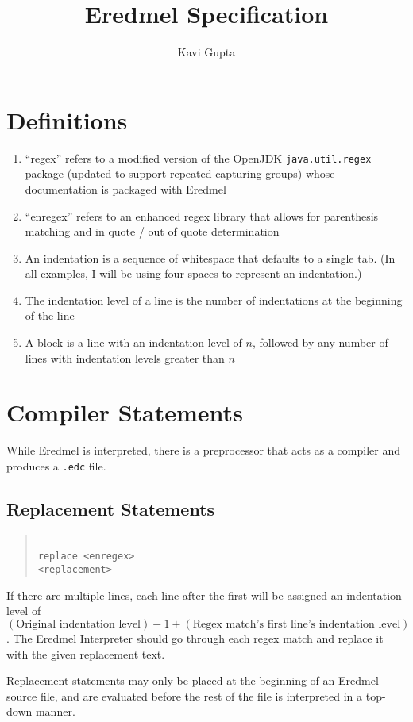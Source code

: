 \documentclass{article}
\newcommand{\code}[1]{\texttt{#1}}
\newcommand{\codeblock}[1]{\begin{quote}\code{\\\noindent #1}\end{quote}}
\newcommand{\indt}{\hspace*{2em}}
\begin{document}
\title{Eredmel Specification}
\author{Kavi Gupta}
\maketitle

\section{Definitions}

\begin{enumerate}
\item ``regex'' refers to a modified version of the OpenJDK \code{java.util.regex} package (updated to support repeated capturing groups) whose documentation is packaged with Eredmel
\item ``enregex'' refers to an enhanced regex library that allows for parenthesis matching and in quote / out of quote determination
\item An indentation is a sequence of whitespace that defaults to a single tab. (In all examples, I will be using four spaces to represent an indentation.)
\item The indentation level of a line is the number of indentations at the beginning of the line 
\item A block is a line with an indentation level of $n$, followed by any number of lines with indentation levels greater than $n$
\end{enumerate}

\section{Compiler Statements}
While Eredmel is interpreted, there is a preprocessor that acts as a compiler and produces a \code{.edc} file.
\subsection{Replacement Statements}
\codeblock{
replace <enregex>\\
\indt<replacement>}
If there are multiple lines, each line after the first will be assigned an indentation level of $(\mbox{Original indentation level}) - 1 + (\mbox{Regex match's first line's indentation level})$. The Eredmel Interpreter should go through each regex match and replace it with the given replacement text.

Replacement statements may only be placed at the beginning of an Eredmel source file, and are evaluated before the rest of the file is interpreted in a top-down manner.
\end{document}
